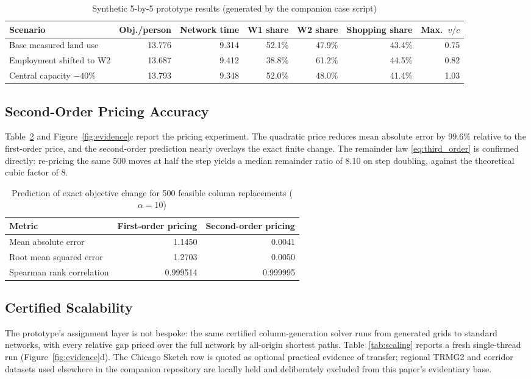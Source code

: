 \documentclass[10pt]{article}
\begin{document}
\begin{table}[H]
\centering
\caption{Synthetic 5-by-5 prototype results (generated by the companion case script)}
\label{tab:scenario_results}
\small
\begin{tabular}{lrrrrrr}
\toprule
Scenario &
Obj./person &
Network time &
W1 share &
W2 share &
Shopping share &
Max.\ $v/c$\\
\midrule
Base measured land use
& 13.776 & 9.314 & 52.1\% & 47.9\% & 43.4\% & 0.75\\
Employment shifted to W2
& 13.687 & 9.412 & 38.8\% & 61.2\% & 44.5\% & 0.82\\
Central capacity $-40\%$
& 13.793 & 9.348 & 52.0\% & 48.0\% & 41.4\% & 1.03\\
\bottomrule
\end{tabular}
\end{table}

\subsection{Second-Order Pricing Accuracy}
Table~\ref{tab:pricing_results} and Figure~\ref{fig:evidence}c report the pricing experiment. The quadratic price reduces mean absolute error by 99.6\% relative to the first-order price, and the second-order prediction nearly overlays the exact finite change. The remainder law \eqref{eq:third_order} is confirmed directly: re-pricing the same 500 moves at half the step yields a median remainder ratio of 8.10 on step doubling, against the theoretical cubic factor of 8.

\begin{table}[H]
\centering
\caption{Prediction of exact objective change for 500 feasible column replacements ($\alpha=10$)}
\label{tab:pricing_results}
\small
\begin{tabular}{lrr}
\toprule
Metric & First-order pricing & Second-order pricing\\
\midrule
Mean absolute error & 1.1450 & 0.0041\\
Root mean squared error & 1.2703 & 0.0050\\
Spearman rank correlation & 0.999514 & 0.999995\\
\bottomrule
\end{tabular}
\end{table}

\subsection{Certified Scalability}
The prototype's assignment layer is not bespoke: the same certified column-generation solver runs from generated grids to standard networks, with every relative gap priced over the full network by all-origin shortest paths. Table~\ref{tab:scaling} reports a fresh single-thread run (Figure~\ref{fig:evidence}d). The Chicago Sketch row is quoted as optional practical evidence of transfer; regional TRMG2 and corridor datasets used elsewhere in the companion repository are locally held and deliberately excluded from this paper's evidentiary base.
\end{document}
